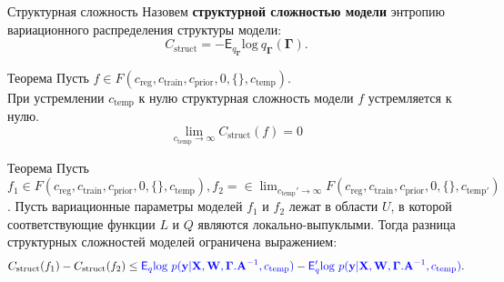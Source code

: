 \documentclass[usenames,dvipsnames,11pt,pdf,utf8,russian,aspectratio=169]{beamer}
\begin{document}
\begin{frame}{Структурная сложность}
\footnotesize
Назовем \textbf{структурной сложностью модели} энтропию вариационного распределения структуры модели:
\[
    C_\text{struct} = -\mathsf{E}_{q_{\boldsymbol{\Gamma}}} \text{log}~q_{\boldsymbol{\Gamma}}(\boldsymbol{\Gamma}).
\]
\begin{block}{Теорема}
Пусть $f \in F(c_{\text{reg}}, c_{\text{train}},  c_{\text{prior}}, 0, \{\},  c_{\text{temp}} )$.\\
При устремлении $ c_{\text{temp}}$ к нулю структурная сложность модели $f$ устремляется к нулю.
\[
    \lim_{c_{\text{temp}} \to \infty} C_\text{struct}(f) = 0
\]
\end{block}

\begin{block}{Теорема}
Пусть $f_1 \in F(c_{\text{reg}}, c_{\text{train}},  c_{\text{prior}}, 0, \{\},  c_{\text{temp}}), f_2 =  \in \lim_{c_{\text{temp}}' \to \infty} F(c_{\text{reg}}, c_{\text{train}},  c_{\text{prior}}, 0, \{\},  c_{\text{temp}'})$.
Пусть вариационные параметры моделей $f_1$ и $f_2$ лежат в области $U$, в которой соответствующие функции $L$ и $Q$ являются локально-выпуклыми. 
Тогда разница структурных сложностей моделей ограничена выражением:
\[
    C_\text{struct}(f_1)  - C_\text{struct}(f_2) \leq \textcolor{blue}{\mathsf{E}_q \text{log}~{p(\mathbf{y} | \mathbf{X}, \mathbf{W}, \boldsymbol{\Gamma}. \mathbf{A}^{-1}, c_{\text{temp}})}} - \textcolor{blue}{\mathsf{E}_q' \text{log}~{p(\mathbf{y} | \mathbf{X}, \mathbf{W}, \boldsymbol{\Gamma}. \mathbf{A}^{-1}, c_{\text{temp}})}}.
\]
\end{block}

\end{frame}
\end{document}
